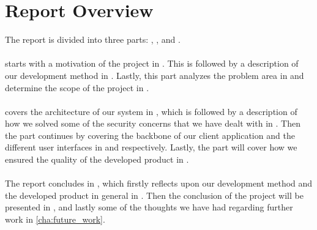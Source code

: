
\section*{Report Overview}
\label{sec:report_overview}

The report is divided into three parts: \emph{}, \emph{}, and \emph{}.
\\\\
 starts with a motivation of the project in . This is followed by a description of our development method in . Lastly, this part analyzes the problem area in  and determine the scope of the project in . 
\\\\
 covers the architecture of our system in , which is followed by a description of how we solved some of the security concerns that we have dealt with in . Then the part continues by covering the backbone of our client application and the different user interfaces in  and  respectively. Lastly, the part will cover how we ensured the quality of the developed product in .
\\\\
The report concludes in , which firstly reflects upon our development method and the developed product in general in . Then the conclusion of the project will be presented in , and lastly some of the thoughts we have had regarding further work in \ref{cha:future_work}.